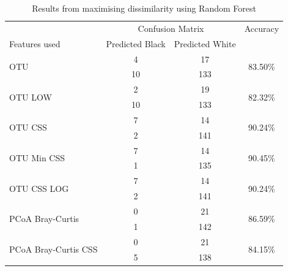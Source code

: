 \begin{table}[h]
	\centering
	\begin{tabular}{l c  c c}
		\toprule
		&\multicolumn{2}{c}{Confusion Matrix} & Accuracy\\
		Features used & Predicted Black&Predicted White&\\
		\midrule
		\multirow{2}{*}{OTU} &4 &17&\multirow{2}{*}{83.50\%}\\
		&	 10&133&\\
		\cmidrule{2-3}
		\multirow{2}{*}{OTU LOW} &2&19&\multirow{2}{*}{82.32\%}\\
		&	 10&133&\\
		\cmidrule{2-3}
		\multirow{2}{*}{OTU CSS}&7 &14&\multirow{2}{*}{90.24\%}\\
		&	 2&141&\\
		\cmidrule{2-3}
		\multirow{2}{*}{OTU Min CSS}&7 &14&\multirow{2}{*}{90.45\%}\\
		&	 1&135&\\
		\cmidrule{2-3}
		\multirow{2}{*}{OTU CSS LOG}&7 &14&\multirow{2}{*}{90.24\%}\\
		&	 2&141&\\
		\cmidrule{2-3}
		\multirow{2}{*}{PCoA Bray-Curtis} &0 &21&\multirow{2}{*}{86.59\%}\\
		&	 1&142&\\
		\cmidrule{2-3}
		\multirow{2}{*}{PCoA Bray-Curtis CSS} &0 &21&\multirow{2}{*}{84.15\%}\\
		&	 5&138&\\
		\bottomrule
	\end{tabular}
	\caption{Results from maximising dissimilarity using Random Forest}
	\label{table:rfrdissimilarity}
\end{table}


